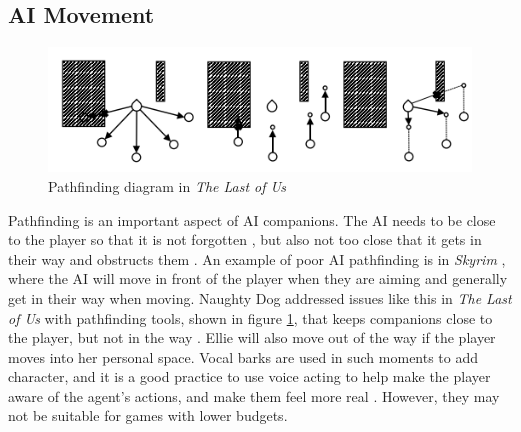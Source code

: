\documentclass{IEEEtran}
\begin{document}

\subsection{AI Movement}
\label{Movement}

\begin{figure}
  \centering
  \includegraphics[width=\linewidth]{Images/IndustryResearch/TLOUPathfinding.png}
  
\caption{Pathfinding diagram in \textit{The Last of Us}}
\label{fig:TLOUPathfinding}
\end{figure}

Pathfinding is an important aspect of AI companions. The AI needs to be close to the player so that it is not forgotten \cite{GAIP2EllieAI}, but also not too close that it gets in their way and obstructs them \cite{CoupledEmpowermentMaximisation}. An example of poor AI pathfinding is in \textit{Skyrim} \cite{tremblay2013adaptive}, where the AI will move in front of the player when they are aiming and generally get in their way when moving. Naughty Dog addressed issues like this in \textit{The Last of Us} with pathfinding tools, shown in figure \ref{fig:TLOUPathfinding}, that keeps companions close to the player, but not in the way \cite{GAIP2EllieAI}. Ellie will also move out of the way if the player moves into her personal space. Vocal barks are used in such moments to add character, and it is a good practice to use voice acting to help make the player aware of the agent’s actions, and make them feel more real \cite{GMTGoodAI}. However, they may not be suitable for games with lower budgets.
\end{document}
